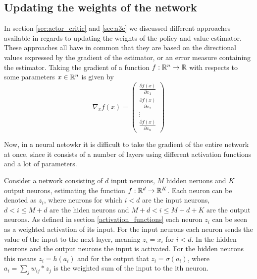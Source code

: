 \documentclass[11pt]{article}
\begin{document}
\subsection{Updating the weights of the network}

In section \ref{sec:actor_critic} and \ref{sec:a3c} we discussed different
approaches available in regards to updating the weights of the policy and value estimator.
These approaches all have in common that they are based on the directional values
expressed by the gradient of the estimator, or an error measure containing
the estimator.
Taking the gradient of a function $f : \mathbb{R}^n \to \mathbb{R}$ with respects to
some parameters $x \in \mathbb{R}^n$ is given by
\begin{equation}
    \nabla_x f(x)
    = \begin{pmatrix}
        \frac{\partial f(x)}{\partial x_1}\\
        \frac{\partial f(x)}{\partial x_2}\\
        \vdots\\
        \frac{\partial f(x)}{\partial x_n}
      \end{pmatrix}
\end{equation}

Now, in a neural netowkr it is difficult to take the gradient of the
entire network at once, since it consists of a number of layers
using different activation functions and a lot of parameters.

Consider a network consisting of $d$ input neurons, $M$ hidden neruons and $K$ output neurons,
estimating the function $f : \mathbb{R}^d \to \mathbb{R}^K$.
Each neuron can be denoted as $z_i$, where neurons for which $i < d$ are the input neurons, $d < i \leq M + d$ are the hiden neurons
and $M + d < i \leq M + d + K$ are the output neurons.
As defined in section \ref{activation_functions} each neuron $z_i$ can be seen as a weighted activation of its input.
For the input neurons each neuron sends the value of the input to the next layer, meaning $z_i = x_i$ for
$i < d$.
In the hidden neurons and the output neurons the input is activated.
For the hidden neurons this means $z_i = h(a_i)$ and for the output that $z_i = \sigma(a_i)$, where
$a_i = \sum\limits_{j} w_{ij} * z_{j}$ is the weighted sum of the input to the ith neuron.
\end{document}
